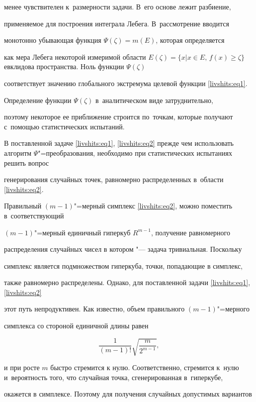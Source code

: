 менее чувствителен к~размерности задачи. В~его основе лежит разбиение,

применяемое для построения интеграла Лебега. В~рассмотрение вводится

монотонно убывающая функция $\Psi (\zeta )=m(E)$, которая определяется

как мера Лебега некоторой измеримой области $E(\zeta )=\{x\vert x\in

E,\,f(x)\ge \zeta \}$ евклидова пространства. Ноль функции $\Psi (\zeta )$

соответствует значению глобального экстремума целевой функции \eqref{livshits:eq1}.

Определение функции $\Psi (\zeta )$ в~аналитическом виде затруднительно,

поэтому некоторое ее приближение строится по~точкам, которые получают с~помощью статистических испытаний.



В поставленной задаче \eqref{livshits:eq1}, \eqref{livshits:eq2} прежде чем использовать алгоритм $\Psi

$"=преобразования, необходимо при статистических испытаниях решить вопрос

генерирования случайных точек, равномерно распределенных в~области \eqref{livshits:eq2}.



Правильный $(m-1)$"=мерный симплекс \eqref{livshits:eq2}, можно поместить в~соответствующий

$(m-1)$"=мерный единичный гиперкуб $R^{m-1}$, получение равномерного

распределения случайных чисел в котором "--- задача тривиальная. Поскольку

симплекс является подмножеством гиперкуба, точки, попадающие в симплекс,

также равномерно распределены. Однако, для поставленной задачи \eqref{livshits:eq1}, \eqref{livshits:eq2}

этот путь непродуктивен. Как известно, объем правильного $(m-1)$"=мерного

симплекса со стороной единичной длины равен

\[

\frac{1}{(m-1)!}\sqrt {\frac{m}{2^{m-1}}},

\]

и при росте $m$ быстро стремится к нулю. Соответственно, стремится к~нулю и~вероятность того, что случайная точка, сгенерированная в~гиперкубе,

окажется в симплексе. Поэтому для получения случайных допустимых вариантов

